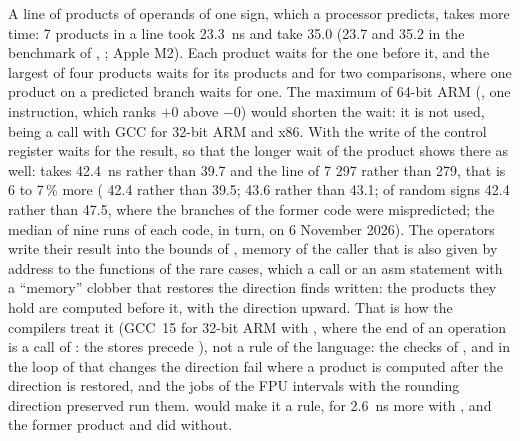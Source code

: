 \medskip
A line of products of operands of one sign, which a processor predicts, takes
more time: 7 products in a line took 23.3~ns and take 35.0 (23.7 and 35.2 in
the benchmark of , ; Apple M2). Each
product waits for the one before it, and the largest of four products waits
for its products and for two comparisons, where one product on a predicted
branch waits for one. The maximum of 64-bit ARM (, one
instruction, which ranks $+0$ above $-0$) would shorten the wait: it is not
used, being a call with GCC for 32-bit ARM and x86. With
 the write of the control register waits for
the result, so that the longer wait of the product shows there as well:
 takes 42.4~ns rather than 39.7 and the line of 7 \code{*} 297
rather than 279, that is 6 to 7\,\% more ( 42.4 rather than
39.5;  43.6 rather than 43.1;  of random signs 42.4
rather than 47.5, where the branches of the former code were mispredicted;
the median of nine runs of each code, in turn, on 6 November 2026). The operators write their result into
the bounds of , memory of the caller that is also given by address
to the functions of the rare cases, which a call or an asm statement with a
``memory'' clobber that restores the direction finds written: the products
they hold are computed before it, with the direction upward. That is how the
compilers treat it (GCC~15 for 32-bit ARM with
, where the end of an operation is a call
of : the stores precede ), not a rule
of the language: the checks of ,  and 
in the loop of  that changes the direction
fail where a product is computed after the direction is restored, and the jobs
of the FPU intervals with the rounding direction preserved run them.
 would make it a rule, for 2.6~ns more with
, and the former product and 
did without.

\medskip
